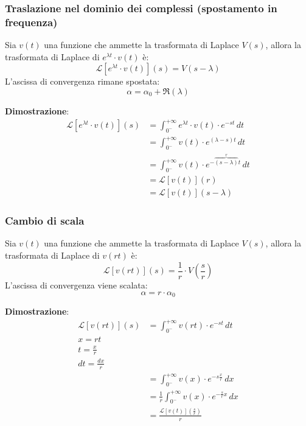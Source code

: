 \documentclass[a4paper]{article}
\begin{document}
\subsubsection{Traslazione nel dominio dei complessi (spostamento in frequenza)}

  Sia \( v(t) \) una funzione che ammette la trasformata di Laplace \( V(s) \), allora
  la trasformata di Laplace di \( e^{\lambda t} \cdot v(t) \) è:
  \[
    \mathcal{L}\left[e^{\lambda t} \cdot v(t)\right](s) = V(s - \lambda)
  \] 
  L'ascissa di convergenza rimane spostata:
  \[
    \alpha = \alpha_0 + \Re(\lambda)
  \] 

  \vspace{1em}
  \noindent
  \textbf{Dimostrazione}:
  \[
    \begin{aligned}
      \mathcal{L}\left[e^{\lambda t} \cdot v(t)\right](s) &= \int_{0^-}^{+\infty} e^{\lambda t} \cdot v(t) \cdot e^{-st} \, dt\\
                                               &= \int_{0^-}^{+\infty} v(t) \cdot e^{(\lambda - s)t} \, dt\\
                                               &= \int_{0^-}^{+\infty} v(t) \cdot e^{-\overbrace{(s - \lambda)}^{r}t} \, dt\\
                                               &= \mathcal{L}[v(t)](r)\\
                                               &= \mathcal{L}[v(t)](s - \lambda)
    \end{aligned}
  \] 

  \subsubsection{Cambio di scala}
  Sia \( v(t) \) una funzione che ammette la trasformata di Laplace \( V(s) \), allora
  la trasformata di Laplace di \( v(r t) \) è:
  \[
    \mathcal{L}[v(r t)](s) = \frac{1}{r} \cdot V\left( \frac{s}{r} \right)
  \] 
  L'ascissa di convergenza viene scalata:
  \[
    \alpha = r \cdot \alpha_0
  \] 

  \vspace{1em}
  \noindent
  \textbf{Dimostrazione}:
  \[
    \begin{aligned}
      \mathcal{L}[v(r t)](s) &= \int_{0^-}^{+\infty} v(r t) \cdot e^{-st} \, dt\\
      x = rt\\
      t = \frac{x}{r}\\
      dt = \frac{dx}{r}\\
                             &= \int_{0^-}^{+\infty} v(x) \cdot e^{-s \frac{x}{r}} \, dx\\
                             &= \frac{1}{r} \int_{0^-}^{+\infty} v(x) \cdot e^{-\frac{s}{r} x} \, dx\\
                             &= \frac{\mathcal{L}[v(t)](\frac{s}{r})}{r}
    \end{aligned}
  \]
\end{document}
